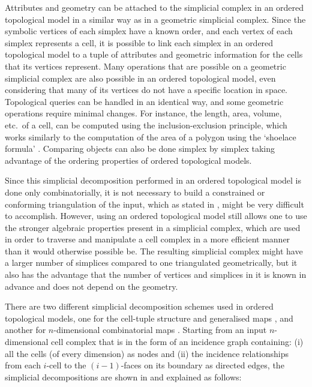 Attributes and geometry can be attached to the simplicial complex in an ordered topological model in a similar way as in a geometric simplicial complex.
Since the symbolic vertices of each simplex have a known order, and each vertex of each simplex represents a cell, it is possible to link each simplex in an ordered topological model to a tuple of attributes and geometric information for the cells that its vertices represent.
Many operations that are possible on a geometric simplicial complex are also possible in an ordered topological model, even considering that many of its vertices do not have a specific location in space.
Topological queries can be handled in an identical way, and some geometric operations require minimal changes.
For instance, the length, area, volume, etc.\ of a cell, can be computed using the inclusion-exclusion principle, which works similarly to the computation of the area of a polygon using the `shoelace formula' \citep{Meister71}.
Comparing objects can also be done simplex by simplex \citep{Gosselin11} taking advantage of the ordering properties of ordered topological models.

Since this simplicial decomposition performed in an ordered topological model is done only combinatorially, it is not necessary to build a constrained or conforming triangulation of the input, which as stated in , might be very difficult to accomplish.
However, using an ordered topological model still allows one to use the stronger algebraic properties present in a simplicial complex, which are used in order to traverse and manipulate a cell complex in a more efficient manner than it would otherwise possible be.
The resulting simplicial complex might have a larger number of simplices compared to one triangulated geometrically, but it also has the advantage that the number of vertices and simplices in it is known in advance and does not depend on the geometry.

There are two different simplicial decomposition schemes used in ordered topological models, one for the cell-tuple structure \citep{Brisson89} and generalised maps \citep{Lienhardt94}, and another for $n$-dimensional combinatorial maps \citep{Lienhardt94}.
Starting from an input $n$-dimensional cell complex that is in the form of an incidence graph containing: (i) all the cells (of every dimension) as nodes and (ii) the incidence relationships from each $i$-cell to the $(i-1)$-faces on its boundary as directed edges, the simplicial decompositions are shown in  and explained as follows:


